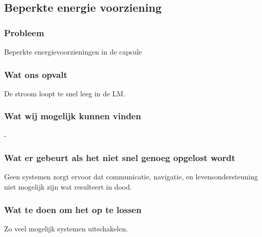 \subsection{Beperkte energie voorziening}

\subsubsection{Probleem}
Beperkte energievoorzieningen in de capsule

\subsubsection{Wat ons opvalt}
De stroom loopt te snel leeg in de LM.


\subsubsection{Wat wij mogelijk kunnen vinden}
-

\subsubsection{Wat er gebeurt als het niet snel genoeg opgelost wordt}
Geen systemen zorgt ervoor dat communicatie, navigatie, en levensondersteuning niet mogelijk zijn wat resulteert in dood.

\subsubsection{Wat te doen om het op te lossen}
Zo veel mogelijk systemen uitschakelen.